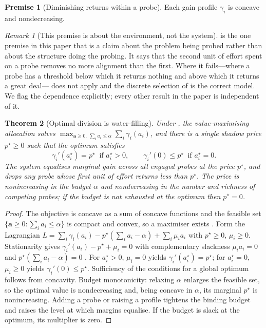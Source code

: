 \documentclass[11pt,twocolumn,a4paper]{article}
\theoremstyle{dirthm}
\newtheorem{theorem}{Theorem}[section]
\theoremstyle{definition}
\newtheorem{axiom}{Premise}
\theoremstyle{remark}
\newtheorem{remark}[theorem]{Remark}
\newcommand{\price}{p^{\star}}
\newcommand{\att}{\alpha}
\newcommand{\alloc}{\mathbf{a}}
\newcommand{\gain}{\gamma}
\newcommand{\set}[1]{\{#1\}}
\begin{document}
\begin{axiom}[Diminishing returns within a probe]
\label{ax:concave}
Each gain profile $\gain_i$ is concave and nondecreasing.
\end{axiom}

\begin{remark}[This premise is about the environment, not the system]
\label{rem:concave-honest}
 is the one premise in this paper that is a claim about the
problem being probed rather than about the structure doing the probing. It
says that the second unit of effort spent on a probe removes no more alignment
than the first. Where it fails---where a probe has a threshold below which it
returns nothing and above which it returns a great deal---
does not apply and the discrete selection of  is the
correct model. We flag the dependence explicitly; every other result in the
paper is independent of it.
\end{remark}

\begin{theorem}[Optimal division is water-filling]
\label{thm:waterfill}
Under , the value-maximising allocation solves
$\max_{\alloc\ge0,\ \sum_i a_i\le\att}\sum_i\gain_i(a_i)$, and there is a
single \emph{shadow price} $\price\ge0$ such that the optimum satisfies
\[
\gain_i'(a_i^{\star})=\price\ \text{ if } a_i^{\star}>0,
\qquad
\gain_i'(0)\le\price\ \text{ if } a_i^{\star}=0 .
\]
The system equalises marginal gain across all engaged probes at the price
$\price$, and drops any probe whose first unit of effort returns less than
$\price$. The price is nonincreasing in the budget $\att$ and nondecreasing in
the number and richness of competing probes; if the budget is not exhausted at
the optimum then $\price=0$.
\end{theorem}

\begin{proof}
The objective is concave as a sum of concave functions and the feasible set
$\set{\alloc\ge0:\sum_i a_i\le\att}$ is compact and convex, so a maximiser
exists \citep{boyd2004}. Form the Lagrangian
$L=\sum_i\gain_i(a_i)-\price(\sum_i a_i-\att)+\sum_i\mu_i a_i$ with
$\price\ge0$, $\mu_i\ge0$. Stationarity gives
$\gain_i'(a_i)-\price+\mu_i=0$ with complementary slackness $\mu_i a_i=0$ and
$\price(\sum_i a_i-\att)=0$ \citep{kuhntucker1951}. For $a_i^{\star}>0$,
$\mu_i=0$ yields $\gain_i'(a_i^{\star})=\price$; for $a_i^{\star}=0$,
$\mu_i\ge0$ yields $\gain_i'(0)\le\price$. Sufficiency of the conditions for
a global optimum follows from concavity. Budget monotonicity: relaxing $\att$
enlarges the feasible set, so the optimal value is nondecreasing and, being
concave in $\att$, its marginal $\price$ is nonincreasing. Adding a probe or
raising a profile tightens the binding budget and raises the level at which
margins equalise. If the budget is slack at the optimum, its multiplier is
zero.
\end{proof}
\end{document}

